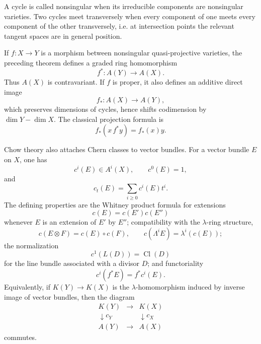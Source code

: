 \documentclass[11pt]{article}
\theoremstyle{plain}
\theoremstyle{definition}
\theoremstyle{remark}
\providecommand{\Cl}{\operatorname{Cl}}
\begin{document}
A cycle is called nonsingular when its irreducible components are nonsingular varieties. Two cycles meet transversely when every component of one meets every component of the other transversely, i.e. at intersection points the relevant tangent spaces are in general position.

If $f:X\to Y$ is a morphism between nonsingular quasi-projective varieties, the preceding theorem defines a graded ring homomorphism
\begin{equation}\label{eq:Chowpull}
   f^*:A(Y)\to A(X).
\end{equation}
Thus $A(X)$ is contravariant. If $f$ is proper, it also defines an additive direct image
\begin{equation}\label{eq:Chowpush}
   f_*:A(X)\to A(Y),
\end{equation}
which preserves dimensions of cycles, hence shifts codimension by $\dim Y-\dim X$. The classical projection formula is
\begin{equation}\label{eq:projectionChow}
   f_*(x\,f^*y)=f_*(x)y.
\end{equation}

Chow theory also attaches Chern classes to vector bundles. For a vector bundle $E$ on $X$, one has
\[
   c^i(E)\in A^i(X),\qquad c^0(E)=1,
\]
and
\[
   c_t(E)=\sum_{i\geq0}c^i(E)t^i.
\]
The defining properties are the Whitney product formula for extensions
\begin{equation}\label{eq:Whitney}
   c(E)=c(E')c(E'')
\end{equation}
whenever $E$ is an extension of $E'$ by $E''$; compatibility with the $\lambda$-ring structure,
\begin{equation}\label{eq:lambdaChern}
   c(E\otimes F)=c(E)\circ c(F),
   \qquad
   c(\Lambda^iE)=\lambda^i(c(E));
\end{equation}
the normalization
\begin{equation}\label{eq:divisorChern}
   c^1(L(D))=\Cl(D)
\end{equation}
for the line bundle associated with a divisor $D$; and functoriality
\begin{equation}\label{eq:chernfunctorial}
   c^i(f^*E)=f^*c^i(E).
\end{equation}
Equivalently, if $K(Y)\to K(X)$ is the $\lambda$-homomorphism induced by inverse image of vector bundles, then the diagram
\[
\begin{array}{ccc}
K(Y) & \longrightarrow & K(X) \\
\downarrow c_Y & & \downarrow c_X \\
A(Y) & \longrightarrow & A(X)
\end{array}
\]
commutes.
\end{document}
